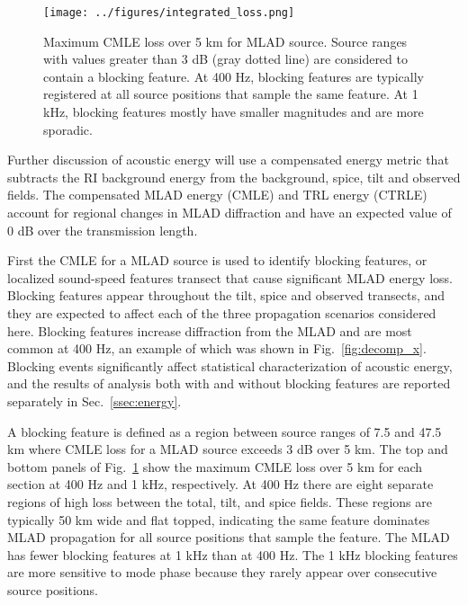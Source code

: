 \documentclass[preprint,NumberedRefs]{JASA}
\begin{document}
\begin{figure}
\texttt{[image: ../figures/integrated\_loss.png]}
    \caption{Maximum CMLE loss over 5 km for MLAD source. Source ranges with values greater than 3 dB (gray dotted line) are considered to contain a blocking feature. At 400 Hz, blocking features are typically registered at all source positions that sample the same feature. At 1 kHz, blocking features mostly have smaller magnitudes and are more sporadic.}
    \label{fig:blocking}
\end{figure}
Further discussion of acoustic energy will use a compensated energy metric that subtracts the RI background energy from the background, spice, tilt and observed fields. The compensated MLAD energy (CMLE) and TRL energy (CTRLE) account for regional changes in MLAD diffraction and have an expected value of 0 dB over the transmission length.

First the CMLE for a MLAD source is used to identify blocking features, or localized sound-speed features transect that cause significant MLAD energy loss. Blocking features appear throughout the tilt, spice and observed transects, and they are expected to affect each of the three propagation scenarios considered here. Blocking features increase diffraction from the MLAD and are most common at 400 Hz, an example of which was shown in Fig.~\ref{fig:decomp_x}. Blocking events significantly affect statistical characterization of acoustic energy, and the results of analysis both with and without blocking features are reported separately in Sec.~\ref{ssec:energy}.

A blocking feature is defined as a region between source ranges of 7.5 and 47.5 km where CMLE loss for a MLAD source exceeds 3 dB over 5 km. The top and bottom panels of Fig.~\ref{fig:blocking} show the maximum CMLE loss over 5 km for each section at 400 Hz and 1 kHz, respectively. At 400 Hz there are eight separate regions of high loss between the total, tilt, and spice fields. These regions are typically 50 km wide and flat topped, indicating the same feature dominates MLAD propagation for all source positions that sample the feature. The MLAD has fewer blocking features at 1 kHz than at 400 Hz. The 1 kHz blocking features are more sensitive to mode phase because they rarely appear over consecutive source positions.
\end{document}
